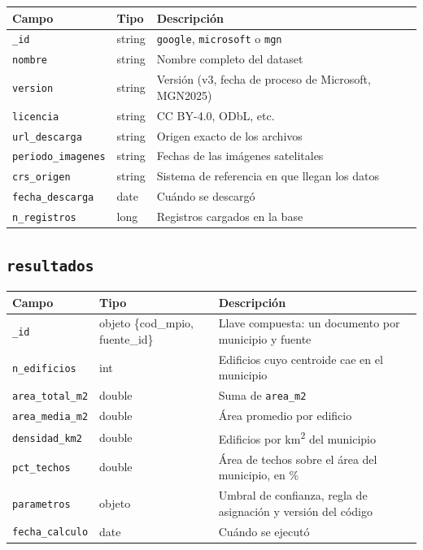 \documentclass[11pt,a4paper]{article}
\newcommand{\campo}[1]{\texttt{#1}}
\begin{document}
\begin{table}[H]
\centering\small
\begin{tabularx}{\textwidth}{@{}p{3.4cm}p{2.4cm}L@{}}
\toprule
\textbf{Campo} & \textbf{Tipo} & \textbf{Descripción} \\
\midrule
\campo{\_id} & string & \campo{google}, \campo{microsoft} o \campo{mgn} \\
\campo{nombre} & string & Nombre completo del dataset \\
\campo{version} & string & Versión (v3, fecha de proceso de Microsoft, MGN2025) \\
\campo{licencia} & string & CC BY-4.0, ODbL, etc. \\
\campo{url\_descarga} & string & Origen exacto de los archivos \\
\campo{periodo\_imagenes} & string & Fechas de las imágenes satelitales \\
\campo{crs\_origen} & string & Sistema de referencia en que llegan los datos \\
\campo{fecha\_descarga} & date & Cuándo se descargó \\
\campo{n\_registros} & long & Registros cargados en la base \\
\bottomrule
\end{tabularx}
\end{table}

\subsection{\texorpdfstring{\campo{resultados}}{resultados}}
 
\begin{table}[H]
\centering\small
\begin{tabularx}{\textwidth}{@{}p{3.4cm}p{3.6cm}L@{}}
\toprule
\textbf{Campo} & \textbf{Tipo} & \textbf{Descripción} \\
\midrule
\campo{\_id} & objeto \{cod\_mpio, fuente\_id\} & Llave compuesta: un documento por municipio y fuente \\
\campo{n\_edificios} & int & Edificios cuyo centroide cae en el municipio \\
\campo{area\_total\_m2} & double & Suma de \campo{area\_m2} \\
\campo{area\_media\_m2} & double & Área promedio por edificio \\
\campo{densidad\_km2} & double & Edificios por km\textsuperscript{2} del municipio \\
\campo{pct\_techos} & double & Área de techos sobre el área del municipio, en \% \\
\campo{parametros} & objeto & Umbral de confianza, regla de asignación y versión del código \\
\campo{fecha\_calculo} & date & Cuándo se ejecutó \\
\bottomrule
\end{tabularx}
\end{table}
\end{document}
